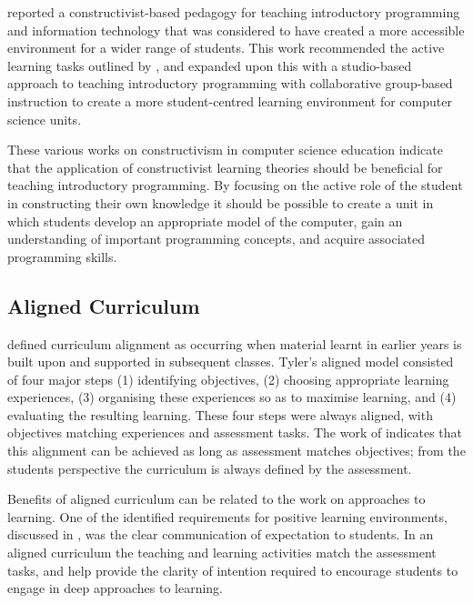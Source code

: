 \citet{Wulf:2005} reported a constructivist-based pedagogy for teaching introductory programming and information technology that was considered to have created a more accessible environment for a wider range of students. This work recommended the active learning tasks outlined by \citet{VanGorp:2001}, and expanded upon this with a studio-based approach to teaching introductory programming with collaborative group-based instruction to create a more student-centred learning environment for computer science units.

These various works on constructivism in computer science education indicate that the application of constructivist learning theories should be beneficial for teaching introductory programming. By focusing on the active role of the student in constructing their own knowledge it should be possible to create a unit in which students develop an appropriate model of the computer, gain an understanding of important programming concepts, and acquire associated programming skills.


\subsection{Aligned Curriculum} %
\label{sub:aligned_curriculum}

\citet{Tyler:1969} defined curriculum alignment as occurring when material learnt in earlier years is built upon and supported in subsequent classes. Tyler's aligned model consisted of four major steps (1) identifying objectives, (2) choosing appropriate learning experiences, (3) organising these experiences so as to maximise learning, and (4) evaluating the resulting learning. These four steps were always aligned, with objectives matching experiences and assessment tasks. The work of \cite{Ramsden:1992} indicates that this alignment can be achieved as long as assessment matches objectives; from the students perspective the curriculum is always defined by the assessment.

Benefits of aligned curriculum can be related to the work on approaches to learning. One of the identified requirements for positive learning environments, discussed in , was the clear communication of expectation to students. In an aligned curriculum the teaching and learning activities match the assessment tasks, and help provide the clarity of intention required to encourage students to engage in deep approaches to learning.

